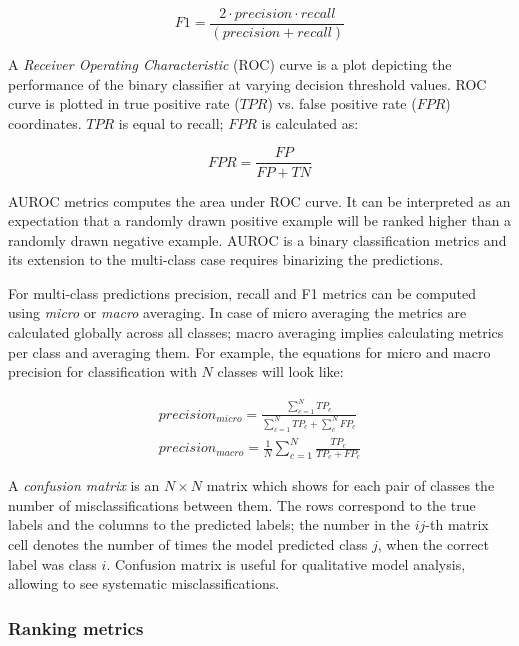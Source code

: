 \begin{equation}
    F1 = \frac{2 \cdot precision \cdot recall}{(precision + recall)}
\end{equation}

 A \textit{Receiver Operating Characteristic} (ROC) curve is a plot depicting the performance of the binary classifier at varying decision threshold values. ROC curve is plotted in true positive rate ($TPR$) vs. false positive rate ($FPR$) coordinates. $TPR$ is equal to recall; $FPR$ is calculated as:

\begin{equation}
    FPR = \frac{FP}{FP + TN}
\end{equation}

AUROC metrics computes the area under ROC curve. It can be interpreted as an expectation that a randomly drawn positive example will be ranked higher than a randomly drawn negative example. AUROC is a binary classification metrics and its extension to the multi-class case requires binarizing the predictions.

 For multi-class predictions precision, recall and F1 metrics can be computed using \textit{micro} or \textit{macro} averaging. In case of micro averaging the metrics are calculated globally across all classes; macro averaging implies calculating metrics per class and averaging them. For example, the equations for micro and macro precision for classification with $N$ classes will look like:
\begin{spreadlines}{15pt}  
\begin{align}
    precision_{micro} = \frac{\sum_{c=1}^N TP_c}{\sum_{c=1}^N TP_c + \sum_{c}^N FP_c} \\
    precision_{macro} = \frac{1}{N}\sum_{c=1}^N \frac{TP_c}{TP_c + FP_c}
\end{align}
\end{spreadlines}

A \textit{confusion matrix} is an $N\times N$ matrix which shows for each pair of classes the number of misclassifications between them. The rows correspond to the true labels and the columns to the predicted labels; the number in the $ij$-th matrix cell denotes the number of times the model predicted class $j$, when the correct label was class $i$. Confusion matrix is useful for qualitative model analysis, allowing to see systematic misclassifications.

\subsubsection{Ranking metrics}

